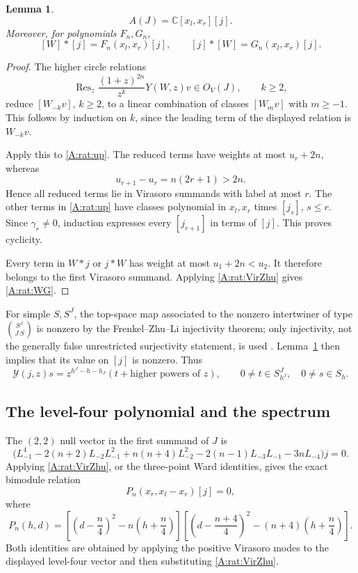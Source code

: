 \documentclass[11pt]{article}
\newtheorem{lemma}[theorem]{Lemma}
\newcommand{\C}{\mathbb C}\newcommand{\Q}{\mathbb Q}\newcommand{\Z}{\mathbb Z}
\numberwithin{equation}{section}
\begin{document}
\begin{lemma}\label{A:rat:cyclic}
\[
 A(J)=\C[x_l,x_r][j].
\]
Moreover, for polynomials $F_n,G_n$,
\begin{equation}\label{A:rat:WG}
 [W]*[j]=F_n(x_l,x_r)[j],\qquad
 [j]*[W]=G_n(x_l,x_r)[j].
\end{equation}
\end{lemma}
\begin{proof}
The higher circle relations
\[
 \operatorname{Res}_z\frac{(1+z)^{2n}}{z^k}Y(W,z)v\in O_V(J),\qquad k\geq2,
\]
reduce $[W_{-k}v]$, $k\geq2$, to a linear combination of classes $[W_mv]$ with $m\geq-1$. This follows by induction on $k$, since the leading term of the displayed relation is $W_{-k}v$.

Apply this to \eqref{A:rat:up}. The reduced terms have weights at most $u_r+2n$, whereas
\[
 u_{r+1}-u_r=n(2r+1)>2n.
\]
Hence all reduced terms lie in Virasoro summands with label at most $r$. The other terms in \eqref{A:rat:up} have classes polynomial in $x_l,x_r$ times $[j_s]$, $s\leq r$. Since $\gamma_r\ne0$, induction expresses every $[j_{r+1}]$ in terms of $[j]$. This proves cyclicity.

Every term in $W*j$ or $j*W$ has weight at most $u_1+2n<u_2$. It therefore belongs to the first Virasoro summand. Applying \eqref{A:rat:VirZhu} gives \eqref{A:rat:WG}.
\end{proof}

For simple $S,S^J$, the top-space map associated to the nonzero intertwiner of type $\binom{S^J}{J\ S}$ is nonzero by the Frenkel--Zhu--Li injectivity theorem; only injectivity, not the generally false unrestricted surjectivity statement, is used \cite[Theorem 2.12]{A:AA}. Lemma~\ref{A:rat:cyclic} then implies that its value on $[j]$ is nonzero. Thus
\begin{equation}\label{A:rat:nonzero}
 \mathcal Y(j,z)s=z^{h^J-h-h_J}(t+\text{higher powers of }z),
 \qquad 0\ne t\in S^J_{h^J},\quad 0\ne s\in S_h.
\end{equation}


\subsection{The level-four polynomial and the spectrum}
The $(2,2)$ null vector in the first summand of $J$ is
\begin{equation}\label{A:rat:null}
 \bigl(L_{-1}^4-2(n+2)L_{-2}L_{-1}^2+n(n+4)L_{-2}^2
       -2(n-1)L_{-3}L_{-1}-3nL_{-4}\bigr)j=0.
\end{equation}
Applying \eqref{A:rat:VirZhu}, or the three-point Ward identities, gives the exact bimodule relation
\begin{equation}\label{A:rat:bimodP}
 P_n(x_r,x_l-x_r)[j]=0,
\end{equation}
where
\begin{equation}\label{A:rat:P}
 P_n(h,d)=
 \left[\left(d-\frac n4\right)^2-n\left(h+\frac n4\right)\right]
 \left[\left(d-\frac{n+4}{4}\right)^2-(n+4)\left(h+\frac n4\right)\right].
\end{equation}
Both identities are obtained by applying the positive Virasoro modes to the displayed level-four vector and then substituting \eqref{A:rat:VirZhu}.
\end{document}
